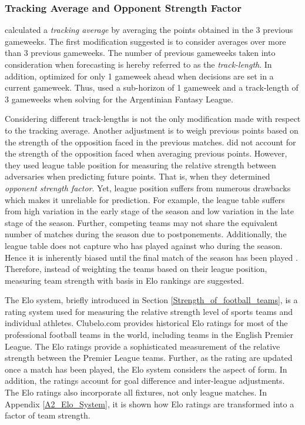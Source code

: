 \newpage

\subsubsection{Tracking Average and Opponent Strength Factor}

\cite{Bonomo} calculated a \textit{tracking average} by averaging the points obtained in the 3 previous gameweeks. The first modification suggested is to consider averages over more than 3 previous gameweeks. The number of previous gameweeks taken into consideration when forecasting is hereby referred to as the \textit{track-length}. In addition, \cite{Bonomo} optimized for only 1 gameweek ahead when decisions are set in a current gameweek. Thus, \cite{Bonomo} used a sub-horizon of 1 gameweek and a track-length of 3 gameweeks when solving for the Argentinian Fantasy League.

\newpar

Considering different track-lengths is not the only modification made with respect to the tracking average. Another adjustment is to weigh previous points based on the strength of the opposition faced in the previous matches. \cite{Bonomo} did not account for the strength of the opposition faced when averaging previous points. However, they used league table position for measuring the relative strength between adversaries when predicting future points. That is, when they determined \textit{opponent strength factor}. Yet, league position suffers from numerous drawbacks which makes it unreliable for prediction. For example, the league table suffers from high variation in the early stage of the season and low variation in the late stage of the season. Further, competing teams may not share the equivalent number of matches during the season due to postponements. Additionally, the league table does not capture who has played against who during the season. Hence it is inherently biased until the final match of the season has been played \citep{Constantinou}. Therefore, instead of weighting the teams based on their league position, measuring team strength with basis in Elo rankings are suggested. 


\newpar

The Elo system, briefly introduced in Section \ref{Strength_of_football_teams}, is a rating system used for measuring the relative strength level of sports teams and individual athletes. Clubelo.com provides historical Elo ratings for most of the professional football teams in the world, including teams in the English Premier League. The Elo ratings provide a sophisticated measurement of the relative strength between the Premier League teams. Further, as the rating are updated once a match has been played, the Elo system considers the aspect of form. In addition, the ratings account for goal difference and inter-league adjustments. The Elo ratings also incorporate all fixtures, not only league matches. In Appendix \ref{A2_Elo_System}, it is shown how Elo ratings are transformed into a factor of team strength. 

